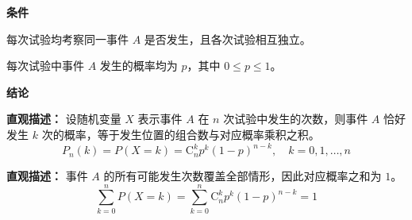 \begin{statementbox}
\textbf{\textcolor{CStatement}{条件}}
\begin{description}[style=nextline, leftmargin=2.8em, labelsep=0.5em, itemsep=0.35em]
\item[\textbf{\textcolor{CStatement}{条件1（独立重复试验）：}}] 每次试验均考察同一事件 $A$ 是否发生，且各次试验相互独立。
\item[\textbf{\textcolor{CStatement}{条件2（概率固定）：}}] 每次试验中事件 $A$ 发生的概率均为 $p$，其中 $0\le p\le 1$。
\end{description}

\textbf{\textcolor{CStatement}{结论}}
\begin{description}[style=nextline, leftmargin=2.8em, labelsep=0.5em, itemsep=0.45em]
\item[\textbf{\textcolor{CStatement}{结论一（概率计算公式）：}}]
\textbf{\textcolor{CStatement}{直观描述：}} 设随机变量 $X$ 表示事件 $A$ 在 $n$ 次试验中发生的次数，则事件 $A$ 恰好发生 $k$ 次的概率，等于发生位置的组合数与对应概率乘积之积。
\[
P_n(k)=P(X=k)=\mathrm{C}_n^k p^k (1-p)^{n-k}, \quad k=0,1,\dots,n
\]

\item[\textbf{\textcolor{CStatement}{推广结论（归一恒等式）：}}]
\textbf{\textcolor{CStatement}{直观描述：}} 事件 $A$ 的所有可能发生次数覆盖全部情形，因此对应概率之和为 $1$。
\[
\sum_{k=0}^n P(X=k)
=
\sum_{k=0}^n \mathrm{C}_n^k p^k (1-p)^{n-k}
=
1
\]
\end{description}
\end{statementbox}